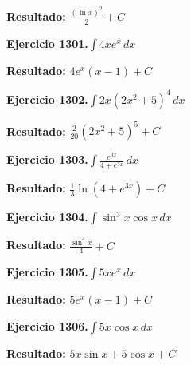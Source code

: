 \documentclass[10pt,a4paper]{article}
\begin{document}
\begin{solbox}
\textbf{Resultado:} \(\displaystyle \frac{(\ln x)^2}{2} + C\)
\end{solbox}

\begin{ejbox}
\textbf{Ejercicio 1301.}\quad $\int 4x e^{x}\,dx$
\end{ejbox}

\begin{solbox}
\textbf{Resultado:} \(\displaystyle 4e^x(x-1) + C\)
\end{solbox}

\begin{ejbox}
\textbf{Ejercicio 1302.}\quad $\int 2x(2x^2 + 5)^{4}\,dx$
\end{ejbox}

\begin{solbox}
\textbf{Resultado:} \(\displaystyle \frac{2}{20}(2x^2+5)^{5} + C\)
\end{solbox}

\newpage
\begin{ejbox}
\textbf{Ejercicio 1303.}\quad $\int \frac{e^{3x}}{4+e^{3x}}\,dx$
\end{ejbox}

\begin{solbox}
\textbf{Resultado:} \(\displaystyle \frac{1}{3}\ln(4+e^{3x}) + C\)
\end{solbox}

\begin{ejbox}
\textbf{Ejercicio 1304.}\quad $\int \sin^{3}x \cos x\,dx$
\end{ejbox}

\begin{solbox}
\textbf{Resultado:} \(\displaystyle \frac{\sin^{4}x}{4} + C\)
\end{solbox}

\begin{ejbox}
\textbf{Ejercicio 1305.}\quad $\int 5x e^{x}\,dx$
\end{ejbox}

\begin{solbox}
\textbf{Resultado:} \(\displaystyle 5e^x(x-1) + C\)
\end{solbox}

\newpage
\begin{ejbox}
\textbf{Ejercicio 1306.}\quad $\int 5x \cos x\,dx$
\end{ejbox}

\begin{solbox}
\textbf{Resultado:} \(\displaystyle 5x\sin x + 5\cos x + C\)
\end{solbox}
\end{document}
